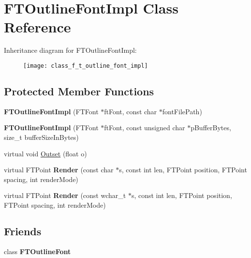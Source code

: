 \hypertarget{class_f_t_outline_font_impl}{
\section{FTOutlineFontImpl Class Reference}
\label{class_f_t_outline_font_impl}
}
Inheritance diagram for FTOutlineFontImpl:\begin{figure}[H]
\begin{center}
\leavevmode
\texttt{[image: class\_f\_t\_outline\_font\_impl]}
\end{center}
\end{figure}
\subsection*{Protected Member Functions}
\begin{DoxyCompactItemize}
\item 
\hypertarget{class_f_t_outline_font_impl_a01af1e37c082fce3f483361b455f9ac2}{
{\bfseries FTOutlineFontImpl} (FTFont $\ast$ftFont, const char $\ast$fontFilePath)}
\label{class_f_t_outline_font_impl_a01af1e37c082fce3f483361b455f9ac2}

\item 
\hypertarget{class_f_t_outline_font_impl_a3b0befb0c886bbc7cb8873afbfc0a9db}{
{\bfseries FTOutlineFontImpl} (FTFont $\ast$ftFont, const unsigned char $\ast$pBufferBytes, size\_\-t bufferSizeInBytes)}
\label{class_f_t_outline_font_impl_a3b0befb0c886bbc7cb8873afbfc0a9db}

\item 
virtual void \hyperlink{class_f_t_outline_font_impl_a22cb75a9c717403f399906d24d4aac82}{Outset} (float o)
\item 
\hypertarget{class_f_t_outline_font_impl_a10caae0ba62ba4c7d5a8742114517651}{
virtual FTPoint {\bfseries Render} (const char $\ast$s, const int len, FTPoint position, FTPoint spacing, int renderMode)}
\label{class_f_t_outline_font_impl_a10caae0ba62ba4c7d5a8742114517651}

\item 
\hypertarget{class_f_t_outline_font_impl_aa4957e338292c7202df9bfb1362e4084}{
virtual FTPoint {\bfseries Render} (const wchar\_\-t $\ast$s, const int len, FTPoint position, FTPoint spacing, int renderMode)}
\label{class_f_t_outline_font_impl_aa4957e338292c7202df9bfb1362e4084}

\end{DoxyCompactItemize}
\subsection*{Friends}
\begin{DoxyCompactItemize}
\item 
\hypertarget{class_f_t_outline_font_impl_a17f6eed308c6d1116a7f1d86010f6c9e}{
class {\bfseries FTOutlineFont}}
\label{class_f_t_outline_font_impl_a17f6eed308c6d1116a7f1d86010f6c9e}

\end{DoxyCompactItemize}


